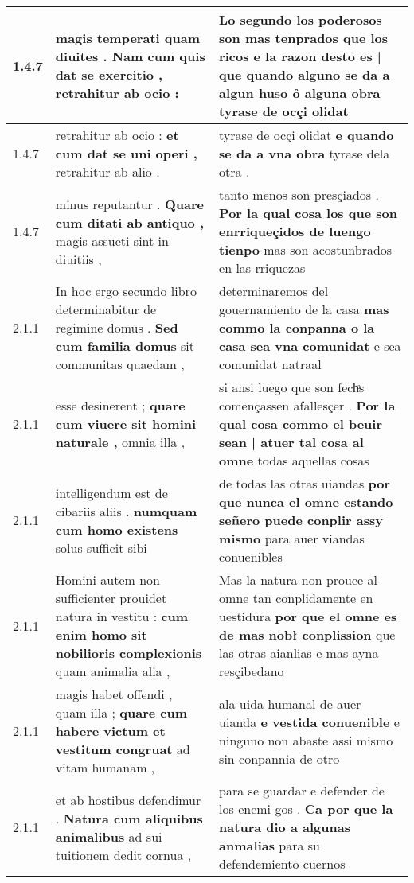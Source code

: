 \begin{tabular}{|p{1cm}|p{6.5cm}|p{6.5cm}|}
1.4.7 & magis temperati quam diuites . \textbf{ Nam cum quis dat se exercitio , } retrahitur ab ocio : & Lo segundo los poderosos son mas tenprados que los ricos \textbf{ e la razon desto es | que quando alguno se da a algun huso o̊ alguna obra } tyrase de ocçi olidat \\\hline
1.4.7 & retrahitur ab ocio : \textbf{ et cum dat se uni operi , } retrahitur ab alio . & tyrase de ocçi olidat \textbf{ e quando se da a vna obra } tyrase dela otra . \\\hline
1.4.7 & minus reputantur . \textbf{ Quare cum ditati ab antiquo , } magis assueti sint in diuitiis , & tanto menos son presçiados . \textbf{ Por la qual cosa los que son enrriqueçidos de luengo tienpo } mas son acostunbrados en las rriquezas \\\hline
2.1.1 & In hoc ergo secundo libro determinabitur de regimine domus . \textbf{ Sed cum familia domus } sit communitas quaedam , & determinaremos del gouernamiento de la casa \textbf{ mas commo la conpanna o la casa sea vna comunidat } e sea comunidat natraal \\\hline
2.1.1 & esse desinerent ; \textbf{ quare cum viuere sit homini naturale , } omnia illa , & si ansi luego que son fechͣs començassen afallesçer . \textbf{ Por la qual cosa commo el beuir sean | atuer tal cosa al omne } todas aquellas cosas \\\hline
2.1.1 & intelligendum est de cibariis aliis . \textbf{ numquam cum homo existens } solus sufficit sibi & de todas las otras uiandas \textbf{ por que nunca el omne estando señero puede conplir assy mismo } para auer viandas conuenibles \\\hline
2.1.1 & Homini autem non sufficienter prouidet natura in vestitu : \textbf{ cum enim homo sit nobilioris complexionis } quam animalia alia , & Mas la natura non prouee al omne tan conplidamente en uestidura \textbf{ por que el omne es de mas nobł conplission } que las otras aianlias e mas ayna resçibedano \\\hline
2.1.1 & magis habet offendi , quam illa ; \textbf{ quare cum habere victum et vestitum congruat } ad vitam humanam , & ala uida humanal de auer uianda \textbf{ e vestida conuenible } e ninguno non abaste assi mismo sin conpannia de otro \\\hline
2.1.1 & et ab hostibus defendimur . \textbf{ Natura cum aliquibus animalibus } ad sui tuitionem dedit cornua , & para se guardar e defender de los enemi gos . \textbf{ Ca por que la natura dio a algunas anmalias } para su defendemiento cuernos \\\hline

\end{tabular}
